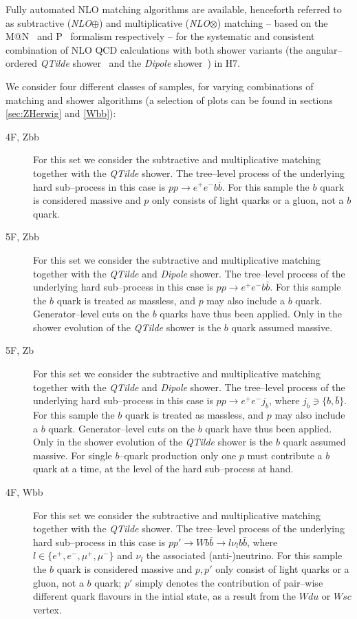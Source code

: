 \documentclass[11pt]{cernrep}
\makeatletter
\newcommand{\Powheg}{P\protect\scalebox{0.8}{OWHEG}\xspace}
\newcommand{\MCatNLO}{M\protect\scalebox{0.8}{C}@N\protect\scalebox{0.8}{LO}\xspace}
\newcommand{\Herwig}{H\protect\scalebox{0.8}{ERWIG}7\xspace}
\makeatother
\begin{document}
Fully automated NLO matching algorithms are available, henceforth referred to
as subtractive (\textit{NLO$\oplus$}) and multiplicative (\textit{NLO$\otimes$})
matching -- based on the \MCatNLO~\cite{Frixione:2002ik} and
\Powheg~\cite{Nason:2004rx} formalism respectively -- for the systematic and
consistent combination of NLO QCD calculations with both shower variants (the
angular--ordered \textit{QTilde} shower~\cite{Gieseke:2003rz} and the
\textit{Dipole} shower~\cite{Platzer:2009jq}) in \Herwig.

We consider four different classes of samples, for varying combinations of
matching and shower algorithms (a selection of plots can be found in sections
\ref{sec:ZHerwig} and \ref{Wbb}):
\begin{description}
\item[4F, Zbb] For this set we consider the subtractive and multiplicative
  matching together with the \textit{QTilde} shower. The tree--level process of
  the underlying hard sub--process in this case is
  $pp \to e^+ e^- b\bar{b}$. For this sample the $b$ quark is
  considered massive and $p$ only consists of light quarks or a gluon, not a $b$
  quark.
\item[5F, Zbb] For this set we consider the subtractive and multiplicative
  matching together with the \textit{QTilde} and \textit{Dipole} shower. The
  tree--level process of the underlying hard sub--process in this case is
  $pp \to e^+ e^- b\bar{b}$. For this sample the $b$ quark is
  treated as massless, and $p$ may also include a $b$ quark. Generator--level
  cuts on the $b$ quarks have thus been applied. Only in the shower evolution of
  the \textit{QTilde} shower is the $b$ quark assumed massive.
\item[5F, Zb] For this set we consider the subtractive and multiplicative
  matching together with the \textit{QTilde} and \textit{Dipole} shower. The
  tree--level process of the underlying hard sub--process in this case is
  $pp \to e^+ e^- j_b$, where $j_b\ni\{b,\bar{b}\}$. For this sample
  the $b$ quark is treated as massless, and $p$ may also include a $b$ quark.
  Generator--level cuts on the $b$ quark have thus been applied. Only in the
  shower evolution of the \textit{QTilde} shower is the $b$ quark assumed
  massive. For single $b$--quark production only one $p$ must contribute a $b$
  quark at a time, at the level of the hard sub--process at hand.
\item[4F, Wbb] For this set we consider the subtractive and multiplicative
  matching together with the \textit{QTilde} shower. The tree--level process of
  the underlying hard sub--process in this case is
  $pp' \to W b\bar{b} \to l \nu_l b\bar{b}$, where
  $l \in \{e^+, e^-, \mu^+, \mu^-\}$ and $\nu_l$ the associated (anti-)neutrino.
  For this sample the $b$ quark is considered massive and $p,p'$ only consist of
  light quarks or a gluon, not a $b$ quark; $p'$ simply denotes the contribution
  of pair--wise different quark flavours in the intial state, as a result from
  the $Wdu$ or $Wsc$ vertex.
\end{description}
\end{document}
